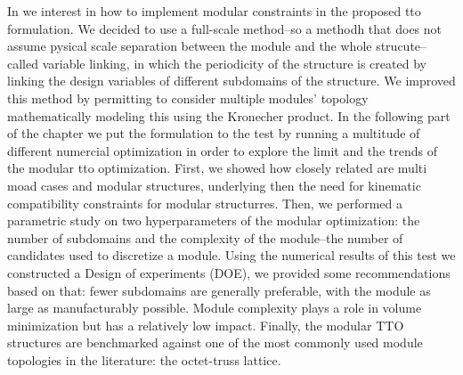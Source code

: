 In \chpref{} we interest in how to implement modular constraints in the proposed \gls{tto} formulation. We decided to use a full-scale method--so a methodh that does not assume pysical scale separation between the module and the whole strucute-- called variable linking, in which the periodicity of the structure is created by linking the design variables of different subdomains of the structure. We improved this method by permitting to consider multiple modules' topology mathematically modeling this using the Kronecher product. In the following part of the chapter we put the formulation to the test by running a multitude of different numercial optimization in order to explore the limit and the trends of the modular tto optimization. First, we showed how closely related are multi moad cases and modular structures, underlying then the need for kinematic compatibility constraints for modular structurres. Then, we performed a parametric study on two hyperparameters of the modular optimization: the number of subdomains and the complexity of the module--\ie the number of candidates used to discretize a module. Using the numerical results of this test we constructed a Design of experiments (DOE), we provided some recommendations based on that: fewer subdomains are generally preferable, with the module as large as manufacturably possible. Module complexity plays a role in volume minimization but has a relatively low impact. Finally, the modular TTO structures are benchmarked against one of the most commonly used module topologies in the literature: the octet-truss lattice.

